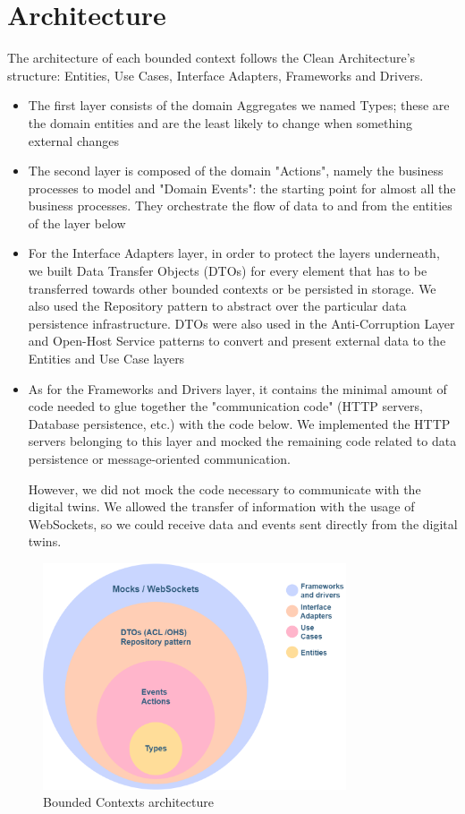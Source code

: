 \chapter{Architecture}
The architecture of each bounded context follows the Clean Architecture's structure: Entities, Use Cases, Interface Adapters, Frameworks and Drivers.

\begin{itemize}
    \item The first layer consists of the domain Aggregates we named Types; these are the domain entities and are the least likely to change when something external changes
    \item The second layer is composed of the domain "Actions", namely the business processes to model and "Domain Events": the starting point for almost all the business processes. They orchestrate the flow of data to and from the entities of the layer below
    \item For the Interface Adapters layer, in order to protect the layers underneath, we built Data Transfer Objects (DTOs) for every element that has to be transferred towards other bounded contexts or be persisted in storage. We also used the Repository pattern to abstract over the particular data persistence infrastructure. DTOs were also used in the Anti-Corruption Layer and Open-Host Service patterns to convert and present external data to the Entities and Use Case layers
    \item As for the Frameworks and Drivers layer, it contains the minimal amount of code needed to glue together the "communication code" (HTTP servers, Database persistence, etc.) with the code below. We implemented the HTTP servers belonging to this layer and mocked the remaining code related to data persistence or message-oriented communication.
    
    However, we did not mock the code necessary to communicate with the digital twins.
    We allowed the transfer of information with the usage of WebSockets, so we could receive data and events sent directly from the digital twins.
\end{itemize}


\begin{figure}[H]
    \centering
    \includegraphics[width=0.8\textwidth]{img/clean-architecture.png}
    \caption{Bounded Contexts architecture}
    \label{img:context-map}
\end{figure}

